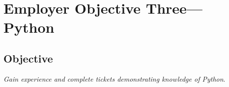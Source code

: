 \section{Employer Objective Three---Python}

\subsection{Objective}
\emph{Gain experience and complete tickets demonstrating knowledge of Python}.
